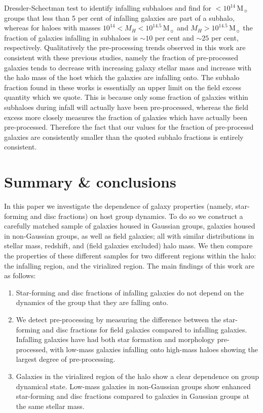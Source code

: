 \documentclass[a4paper,fleqn,usenatbib]{mnras}
\newcommand{\Msun}{\,\mathrm{M_{\sun}}}
\begin{document}
Dressler-Schectman test \citep{dressler1988} to identify infalling
subhaloes and find for $<10^{14}\Msun$ groups that less than 5 per
cent of infalling galaxies are part of a subhalo, whereas for haloes
with masses $10^{14} < M_H < 10^{14.5}\Msun$ and $M_H >
10^{14.5}\Msun$ the fraction of galaxies infalling in subhaloes is
$\sim 10$ per cent and $\sim 25$ per cent, respectively.
Qualitatively the pre-processing trends observed in this work are
consistent with these previous studies, namely the fraction of
pre-processed galaxies tends to decrease with increasing galaxy stellar mass and
increase with the halo mass of the host which the galaxies are
infalling onto.  The subhalo fraction found in these works is
essentially an upper limit on the field excess quantity which we
quote.  This is because only some fraction of galaxies within subhaloes
during infall will actually have been pre-processed, whereas the
field excess more closely measures the fraction of galaxies
which have actually been pre-processed.  Therefore the fact that our
values for the fraction of pre-processd galaxies are consistently
smaller than the quoted subhalo fractions is entirely consistent.


\section{Summary \& conclusions}
\label{sec:summary}

In this paper we investigate the dependence of galaxy properties
(namely, star-forming and disc fractions) on host group dynamics.  To
do so we construct a carefully matched sample of galaxies housed in
Gaussian groups, galaxies housed in non-Gaussian groups, as well as
field galaxies; all with similar distributions in stellar mass,
redshift, and (field galaxies excluded) halo mass.  We then compare
the properties of these different samples for two different regions
within the halo: the infalling region, and the virialized region.  The
main findings of this work are as follows:

\begin{enumerate}
  \item Star-forming and disc fractions of infalling galaxies do not
    depend on the dynamics of the group that they are falling onto.

  \item We detect pre-processing by measuring the difference between
    the star-forming and disc fractions for field galaxies compared to
    infalling galaxies.  Infalling galaxies have had both star
    formation and morphology pre-processed, with low-mass galaxies
    infalling onto high-mass haloes showing the largest degree of
    pre-processing.

  \item Galaxies in the virialized region of the halo show a clear
    dependence on group dynamical state.  Low-mass galaxies in
    non-Gaussian groups show enhanced star-forming and disc fractions
    compared to galaxies in Gaussian groups at the same stellar mass. 
\end{enumerate}
\end{document}
